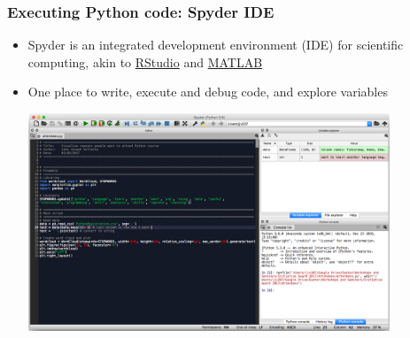\documentclass[pdf]{beamer}
\begin{document}
\begin{frame}[fragile]
\frametitle{Executing Python code: Spyder IDE}
\begin{itemize}
	\item Spyder is an integrated development environment (IDE) for scientific computing, akin to \href{https://www.rstudio.com/}{RStudio} and \href{https://uk.mathworks.com/products/matlab.html}{MATLAB} 
	\item One place to write, execute and debug code, and explore variables

	\centering
	\includegraphics[width=0.85\textwidth]{spyder.png}
\end{itemize}
\end{frame}
\end{document}

